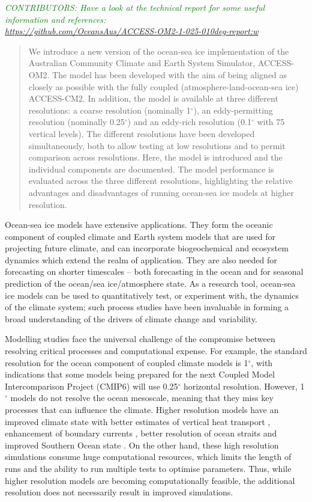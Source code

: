 \documentclass[gmd, manuscript]{copernicus}
\newcommand{\CONTRIBUTORS}[1]{\textcolor{green}{\textsf{\textsl{CONTRIBUTORS: #1}}}}
\begin{document}
\CONTRIBUTORS{Have a look at the technical report for some useful information and references:\\
\url{https://github.com/OceansAus/ACCESS-OM2-1-025-010deg-report:w
}}

\begin{abstract}
We introduce a new version of the ocean-sea ice implementation of the Australian Community Climate and Earth System Simulator, ACCESS-OM2.
The model has been developed with the aim of being aligned as closely as possible with the fully coupled (atmosphere-land-ocean-sea ice) ACCESS-CM2.
In addition, the model is available at three different resolutions: a coarse resolution (nominally 1$^\circ$), an eddy-permitting resolution (nominally 0.25$^\circ$) and an eddy-rich resolution (0.1$^\circ$ with 75 vertical levels).
The different resolutions have been developed simultaneously, both to allow testing at low resolutions and to permit comparison across resolutions.
Here, the model is introduced and the individual components are documented. 
The model performance is evaluated across the three different resolutions, highlighting the relative advantages and disadvantages of running ocean-sea ice models at higher resolution.
\end{abstract}




\introduction  %

Ocean-sea ice models have extensive applications.
They form the oceanic component of coupled climate and Earth system models that are used for projecting future climate, and can incorporate biogeochemical and ecosystem dynamics which extend the realm of application.
They are also needed for forecasting on shorter timescales -- both forecasting in the ocean and for seasonal prediction of the ocean/sea ice/atmosphere state.
As a research tool, ocean-sea ice models can be used to quantitatively test, or experiment with, the dynamics of the climate system; such process studies have been invaluable in forming a broad understanding of the drivers of climate change and variability.

Modelling studies face the universal challenge of the compromise between resolving critical processes and computational expense.
For example, the standard resolution for the ocean component of coupled climate models is 1$^\circ$, with indications that some models being prepared for the next Coupled Model Intercomparison Project (CMIP6) will use 0.25$^\circ$ horizontal resolution.
However, 1$^\circ$ models do not resolve the ocean mesoscale, meaning that they miss key processes that can influence the climate. 
Higher resolution models have an improved climate state with better estimates of vertical heat transport \citep{Griffies2015}, enhancement of boundary currents \citep{Hewitt2016}, better resolution of ocean straits and improved Southern Ocean state \citep{Bishop2016}.
On the other hand, these high resolution simulations consume huge computational resources, which limits the length of runs and the ability to run multiple tests to optimise parameters.
Thus, while higher resolution models are becoming computationally feasible, the additional resolution does not necessarily result in improved simulations.
\end{document}
